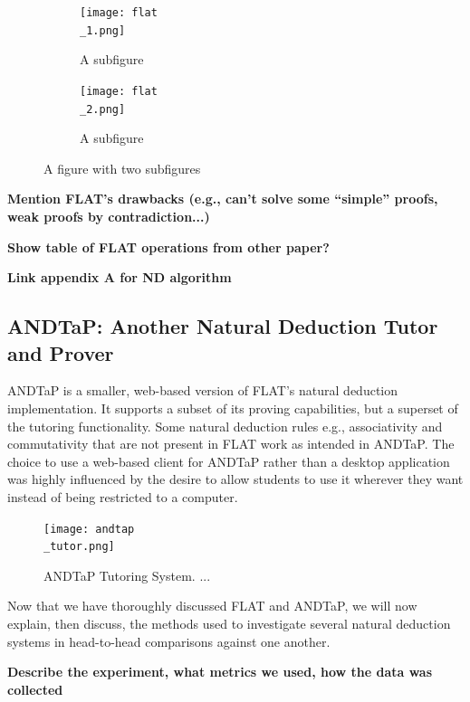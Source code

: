 \documentclass[ms]{uncgdissertationexp2}
\theoremstyle{plain}
\theoremstyle{definition}
\theoremstyle{remark}
\newcommand{\titlecaption}[2]{\caption[#1]{#1. #2}}
\begin{document}
    \begin{figure}
        \centering
        \begin{subfigure}{.5\textwidth}
          \centering
          \texttt{[image: flat\\\_1.png]}
          \caption{A subfigure}
          \label{fig:flat1}
        \end{subfigure}%
        \begin{subfigure}{.5\textwidth}
          \centering
          \texttt{[image: flat\\\_2.png]}
          \caption{A subfigure}
          \label{fig:flat2}
        \end{subfigure}
        \caption{A figure with two subfigures}
        \label{fig:flatfigures}
    \end{figure}

    \textbf{Mention FLAT's drawbacks (e.g., can't solve some ``simple'' proofs, weak proofs by contradiction...)}

    \textbf{Show table of FLAT operations from other paper?}

    \textbf{Link appendix A for ND algorithm}

    \subsection{ANDTaP: Another Natural Deduction Tutor and Prover}
    ANDTaP is a smaller, web-based version of FLAT's natural deduction implementation. It supports a subset of its proving capabilities, but a superset of the tutoring functionality. Some natural deduction rules e.g., associativity and commutativity that are not present in FLAT work as intended in ANDTaP. The choice to use a web-based client for ANDTaP rather than a desktop application was highly influenced by the desire to allow students to use it wherever they want instead of being restricted to a computer.

    \begin{figure}
        \centering
        \texttt{[image: andtap\\\_tutor.png]}
        \titlecaption{ANDTaP Tutoring System}{...}
        \label{fig:andtap}
    \end{figure} 

    Now that we have thoroughly discussed FLAT and ANDTaP, we will now explain, then discuss, the methods used to investigate several natural deduction systems in head-to-head comparisons against one another.

    \textbf{Describe the experiment, what metrics we used, how the data was collected}
\end{document}
